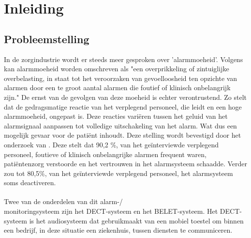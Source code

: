 


% 

\section{Inleiding}%
\label{sec:inleiding}

\subsection{Probleemstelling}

In de zorgindustrie wordt er steeds meer gesproken over 'alarmmoeheid'. Volgens \textcite{Ferrara2023} kan alarmmoeheid worden omschreven als "een overprikkeling of zintuiglijke overbelasting, in staat tot het veroorzaken van gevoelloosheid ten opzichte van alarmen door een te groot aantal alarmen die foutief of klinisch onbelangrijk zijn." De ernst van de gevolgen van deze moeheid is echter verontrustend. Zo stelt \textcite{Ferrara2023} dat de gedragsmatige reactie van het verplegend personeel, die leidt en een hoge alarmmoeheid, ongepast is. Deze reacties variëren tussen het geluid van het alarmsignaal aanpassen tot volledige uitschakeling van het alarm. Wat dus een mogelijk gevaar voor de patiënt  inhoudt. Deze stelling wordt bevestigd door het onderzoek van \textcite{Casey2018}. Deze stelt dat 90,2 \%, van het geïnterviewde verplegend personeel, foutieve of klinisch onbelangrijke alarmen frequent waren, patiëntenzorg verstoorde en het vertrouwen in het alarmsysteem schaadde. Verder zou tot 80,5\%, van het geïnterviewde  verplegend personeel, het alarmsysteem soms deactiveren.
\\\\
Twee van de onderdelen van dit alarm-/\\monitoringsysteem zijn het DECT-systeem en het BELET-systeem. Het DECT-systeem is het audiosysteem dat gebruikmaakt van een mobiel toestel om binnen een bedrijf, in deze situatie een ziekenhuis, tussen diensten te communiceren. 

